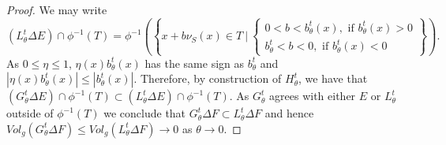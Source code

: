 \documentclass[11pt]{article}
\begin{document}
\begin{proof}
\bigskip

We may write
\begin{equation*}
    (L^t_\theta \Delta E) \cap \phi^{-1}(T) = \phi^{-1}\left(\left\{x + b\nu_S(x) \in T \: \bigg| \: 
    \begin{cases}
    0 < b < b^t_\theta(x), \text{ if } b^t_\theta(x) > 0\\
    b^t_\theta < b < 0, \text{ if } b^t_\theta(x) < 0
    \end{cases}\right\}\right).
\end{equation*}
As $0 \leq \eta \leq 1$, $\eta(x)b^t_\theta(x)$ has the same sign as $b^t_\theta$ and $|\eta(x)b^t_\theta(x)| \leq |b^t_\theta(x)|$. Therefore, by construction of $H^t_\theta$, we have that $(G^t_\theta \Delta E) \cap \phi^{-1}(T) \subset (L^t_\theta \Delta E) \cap \phi^{-1}(T)$. As $G^t_\theta$ agrees with either $E$ or $L^t_\theta$ outside of $\phi^{-1}(T)$ we conclude that $G^t_\theta \Delta F \subset L^t_\theta \Delta F$ and hence $Vol_g(G^t_\theta \Delta F) \leq Vol_g(L^t_\theta \Delta F) \rightarrow 0$ as $\theta \rightarrow 0$. 

\bigskip


\end{proof}
\end{document}
